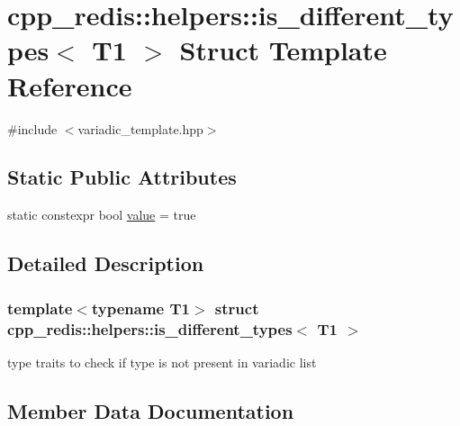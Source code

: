 \hypertarget{structcpp__redis_1_1helpers_1_1is__different__types_3_01_t1_01_4}{}\section{cpp\+\_\+redis\+:\+:helpers\+:\+:is\+\_\+different\+\_\+types$<$ T1 $>$ Struct Template Reference}
\label{structcpp__redis_1_1helpers_1_1is__different__types_3_01_t1_01_4}


{\ttfamily \#include $<$variadic\+\_\+template.\+hpp$>$}

\subsection*{Static Public Attributes}
\begin{DoxyCompactItemize}
\item 
static constexpr bool \hyperlink{structcpp__redis_1_1helpers_1_1is__different__types_3_01_t1_01_4_ae05b9b4af6846340ac66fcf64a622397}{value} = true
\end{DoxyCompactItemize}


\subsection{Detailed Description}
\subsubsection*{template$<$typename T1$>$\newline
struct cpp\+\_\+redis\+::helpers\+::is\+\_\+different\+\_\+types$<$ T1 $>$}

type traits to check if type is not present in variadic list 

\subsection{Member Data Documentation}
\mbox{\label{structcpp__redis_1_1helpers_1_1is__different__types_3_01_t1_01_4_ae05b9b4af6846340ac66fcf64a622397}} 
